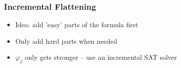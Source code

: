
\begin{frame}

\frametitle{Incremental Flattening}

\begin{itemize}

\item Idea: add 'easy' parts of the formula first
\vfill

\item Only add hard parts when needed
\vfill

\item $\varphi_f$ only gets stronger -- use an \alert{incremental SAT
solver}

\end{itemize}

\end{frame}



